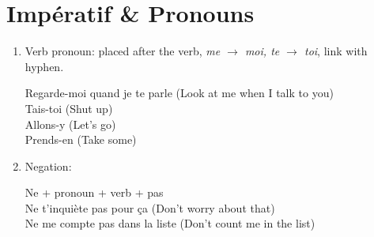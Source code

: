 \documentclass{book}
\begin{document}
\chapter{Impératif \& Pronouns}
    \begin{enumerate}
        \item Verb pronoun: placed after the verb, \textit{me $\to$ moi, te $\to$ toi}, link with hyphen.
            \begin{center}
                Regarde-moi quand je te parle (Look at me when I talk to you) \\
                Tais-toi (Shut up) \\
                Allons-y (Let's go) \\
                Prends-en (Take some)
            \end{center}
        \item Negation:
            \begin{center}
                Ne + pronoun + verb + pas \\
                Ne t'inquiète pas pour ça (Don't worry about that) \\
                Ne me compte pas dans la liste (Don't count me in the list)
            \end{center}

    \end{enumerate}
\end{document}
